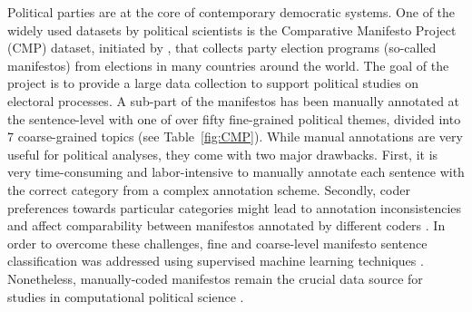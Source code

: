 \documentclass[11pt,a4paper]{article}
\newcommand{\tabref}[2][]{Table#1~\ref{#2}\xspace}
\begin{document}


Political parties are at the core of contemporary democratic systems. One of the widely used datasets by political scientists is the Comparative
Manifesto Project (CMP) dataset, initiated by , that collects party election programs (so-called manifestos) from elections in many countries around the world. The goal of the project is to provide a large data collection to support political studies on electoral processes. A sub-part of the manifestos has been manually annotated at the sentence-level with one of over fifty fine-grained political themes, divided into 7 coarse-grained topics (see \tabref{fig:CMP}).  While manual annotations are very useful for political analyses, they come with two major drawbacks. First, it is very time-consuming and labor-intensive to manually annotate each sentence with the correct category from a complex annotation scheme. Secondly, coder preferences towards particular categories might lead to annotation inconsistencies and affect comparability between manifestos annotated by different coders \cite{coder}. In order to overcome these challenges, fine and coarse-level manifesto sentence classification was addressed using supervised machine learning techniques \cite{verberne2014automatic, zirn2016classifying}. Nonetheless, manually-coded manifestos remain the crucial data source for studies in computational political science \cite{lowe2011scaling, nanni}. 
\end{document}
